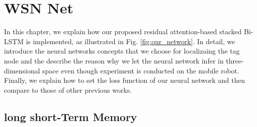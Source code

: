 \documentclass{ieeeaccess}
\begin{document}







\section{WSN Net}

In this chapter, we explain how our proposed residual attention-based stacked Bi-LSTM is implemented, as illustrated in Fig. \ref{fig:our_network}. 
In detail, we introduce the neural networks concepts that we choose for localizaing the tag node and the describe the reason why we let the neural network infer in three-dimensional space even though experiment is conducted on the mobile robot. Finally, we explain how to set the loss function of our neural network and then compare to those of other previous works.


\subsection{long short-Term Memory}
\end{document}
